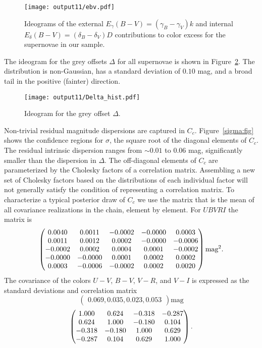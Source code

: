 \documentclass{aastex61}   	%
\begin{document}
\begin{figure}[htbp] %
   \centering
   \texttt{[image: output11/ebv.pdf]}
   \caption{Ideograms of the external $E_\gamma(B-V) =(\gamma_B-\gamma_V)k$ and
   internal $E_\delta(B-V) = (\delta_B-\delta_V)D$  contributions to color excess  for the supernovae in our sample.
   \label{ebv:fig}}
\end{figure}



The ideogram for the grey offsets $\Delta$ for all supernovae is shown in Figure~\ref{hist:fig}.  The distribution is non-Gaussian, 
has a standard deviation of
$0.10$
mag, and a broad tail in the positive (fainter) direction.
\begin{figure}[htbp] %
   \centering
   \texttt{[image: output11/Delta\_hist.pdf]} 
   \caption{Ideogram for the grey offset $\Delta$.
   \label{hist:fig}}
\end{figure}


Non-trivial residual magnitude dispersions are captured in $C_c$.   Figure~\ref{sigma:fig} shows the confidence regions for $\sigma$, the
square root of the diagonal elements of $C_c$.  The residual intrinsic dispersion ranges from
$\sim 0.01$ to 0.06 mag, significantly smaller
than the dispersion in $\Delta$.
The off-diagonal elements of $C_c$ are parameterized by the Cholesky factors of a correlation matrix.
Assembling
a new set of Cholesky factors based on the distributions of each individual factor will not generally satisfy the condition of representing a correlation matrix.  
To characterize a typical posterior draw of $C_c$ we use the matrix that is the mean of all covariance realizations in the
chain, element by element.
For $UBVRI$ the matrix is
\begin{equation}
\begin{pmatrix}
0.0040 & 0.0011 & -0.0002 & -0.0000 & 0.0003 \cr
0.0011 & 0.0012 & 0.0002 & -0.0000 & -0.0006 \cr
-0.0002 & 0.0002 & 0.0004 & 0.0001 & -0.0002 \cr
-0.0000 & -0.0000 & 0.0001 & 0.0002 & 0.0002 \cr
0.0003 & -0.0006 & -0.0002 & 0.0002 & 0.0020
 \end{pmatrix} \text{mag}^2.
 \label{mag_cov:eqn}
 \end{equation}
The  covariance of the colors $U-V$, $B-V$, $V-R$, and $V-I$ is
expressed as the standard deviations and
 correlation matrix
 \begin{equation}
 \begin{pmatrix}
0.069 , 0.035 , 0.023 , 0.053
  \end{pmatrix} \text{mag}
 \label{color_sd:eqn}
   \end{equation}
 \begin{equation}
\begin{pmatrix}
1.000 & 0.624 & -0.318 & -0.287 \cr
0.624 & 1.000 & -0.180 & 0.104 \cr
-0.318 & -0.180 & 1.000 & 0.629 \cr
-0.287 & 0.104 & 0.629 & 1.000
  \end{pmatrix}.
  \label{color_cor:eqn}
 \end{equation}
 
\end{document}
